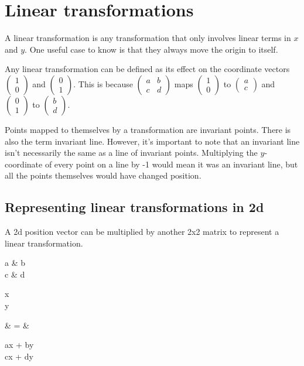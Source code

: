 \section{Linear transformations}
A linear transformation is any transformation that only involves linear terms in $x$ and $y$. One useful case to know is that they always move the origin to itself.

Any linear transformation can be defined as its effect on the coordinate vectors $\begin{pmatrix}1 \\ 0 \end{pmatrix}$ and $\begin{pmatrix}0 \\ 1 \end{pmatrix}$. This is because $\begin{pmatrix}a & b \\ c & d\end{pmatrix}$ maps $\begin{pmatrix}1 \\ 0 \end{pmatrix}$ to $\begin{pmatrix}a \\ c \end{pmatrix}$ and $\begin{pmatrix}0 \\ 1 \end{pmatrix}$ to $\begin{pmatrix}b \\ d \end{pmatrix}$.

Points mapped to themselves by a transformation are invariant points. There is also the term invariant line. However, it's important to note that an invariant line isn't necessarily the same as a line of invariant points. Multiplying the $y$-coordinate of every point on a line by -1 would mean it was an invariant line, but all the points themselves would have changed position.

\subsection{Representing linear transformations in 2d}
A 2d position vector can be multiplied by another 2x2 matrix to represent a linear transformation.
\begin{ea}[rCl]
	\begin{pmatrix}a & b \\ c & d\end{pmatrix}
	\begin{pmatrix}x \\ y\end{pmatrix}
	& = &
	\begin{pmatrix}ax + by \\ cx + dy\end{pmatrix}
\end{ea}

